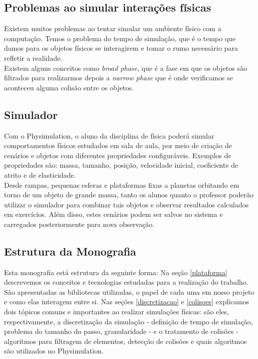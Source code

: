 \subsection{Problemas ao simular interações físicas} %
Existem muitos problemas ao tentar simular um ambiente físico com a computação. Temos o problema do tempo de simulação, 
que é o tempo que damos para os objetos físicos se interagirem e tomar o rumo necessário para refletir a realidade. \\

Existem alguns conceitos como \textit{broad phase}, que é a fase em que os objetos são filtrados para realizarmos depois a \textit{narrow phase} que é onde verificamos se aconteceu alguma colisão entre os objetos.

\subsection{Simulador}
Com o Physimulation, o aluno da disciplina de física poderá simular comportamentos físicos estudados em sala de aula, por meio de criação de cenários e objetos com diferentes propriedades configuráveis. Exemplos de propriedades são: massa, tamanho, posição, velocidade inicial, coeficiente de atrito e de elasticidade. \\

Desde rampas, pequenas esferas e plataformas fixas a planetas orbitando em torno de um objeto de grande massa, tanto os alunos quanto o professor poderão utilizar o simulador para combinar tais objetos e observar resultados calculados em exercícios. Além disso, estes cenários podem ser salvos no sistema e carregados posteriormente para nova observação.

\subsection{Estrutura da Monografia}
Esta monografia está estrutura da seguinte forma: Na seção \ref{plataforma} descrevemos os conceitos e tecnologias estudadas para a realização do trabalho. São apresentadas as bibliotecas utilizadas, o papel de cada uma em nosso projeto e como elas interagem entre si. Nas seções \ref{discretizacao} e \ref{colisoes} explicamos dois tópicos comuns e importantes ao realizar simulações físicas: são eles, respectivamente, a discretização da simulação - definição de tempo de simulação, problema do tamanho do passo, granularidade - e o tratamento de colisões - algoritmos para filtragem de elementos, detecção de colisões e quais algoritmos são utilizados no Physimulation.  \\

